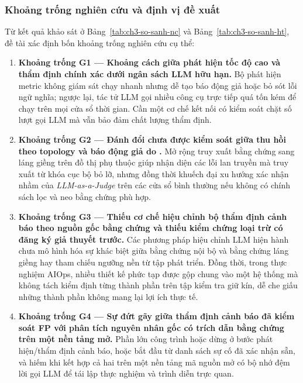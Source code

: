 \subsubsection{Khoảng trống nghiên cứu và định vị đề xuất}
\label{sec:ch3-khoang-trong}

Từ kết quả khảo sát ở Bảng~\ref{tab:ch3-so-sanh-nc} và Bảng~\ref{tab:ch3-so-sanh-ht}, đề tài xác định bốn khoảng trống nghiên cứu cụ thể:

\begin{enumerate}
  \item \textbf{Khoảng trống G1 — Khoảng cách giữa phát hiện tốc độ cao và thẩm định chính xác dưới ngân sách LLM hữu hạn.} Bộ phát hiện metric không giám sát chạy nhanh nhưng dễ tạo báo động giả hoặc bỏ sót lỗi ngữ nghĩa; ngược lại, tác tử LLM gọi nhiều công cụ trực tiếp quá tốn kém để chạy trên mọi cửa sổ thời gian. Cần một cơ chế kết nối có kiểm soát chặt số lượt gọi LLM mà vẫn bảo đảm chất lượng thẩm định.
  \item \textbf{Khoảng trống G2 — Đánh đổi chưa được kiểm soát giữa thu hồi theo topology và báo động giả do .} Mở rộng truy xuất bằng chứng sang láng giềng trên đồ thị phụ thuộc giúp nhận diện các lỗi lan truyền mà truy xuất từ khóa cục bộ bỏ lỡ, nhưng đồng thời khuếch đại xu hướng xác nhận nhầm của \emph{LLM-as-a-Judge} trên các cửa sổ bình thường nếu không có chính sách lọc và neo bằng chứng phù hợp.
  \item \textbf{Khoảng trống G3 — Thiếu cơ chế hiệu chỉnh bộ thẩm định cảnh báo theo nguồn gốc bằng chứng và thiếu kiểm chứng loại trừ có đăng ký giả thuyết trước.} Các phương pháp hiệu chỉnh LLM hiện hành chưa mô hình hóa sự khác biệt giữa bằng chứng nội bộ và bằng chứng láng giềng hay tham chiếu ngưỡng nền từ tập phát triển. Đồng thời, trong thực nghiệm AIOps, nhiều thiết kế phức tạp được gộp chung vào một hệ thống mà không tách kiểm định từng thành phần trên tập kiểm tra giữ kín, dễ che giấu những thành phần không mang lại lợi ích thực tế.
  \item \textbf{Khoảng trống G4 — Sự đứt gãy giữa thẩm định cảnh báo đã kiểm soát FP với phân tích nguyên nhân gốc có trích dẫn bằng chứng trên một nền tảng mở.} Phần lớn công trình hoặc dừng ở bước phát hiện/thẩm định cảnh báo, hoặc bắt đầu  từ danh sách sự cố đã xác nhận sẵn, và hiếm khi kết hợp cả hai trên một nền tảng mã nguồn mở có bộ nhớ đệm lời gọi LLM để tái lập thực nghiệm và trình diễn trực quan.
\end{enumerate}

